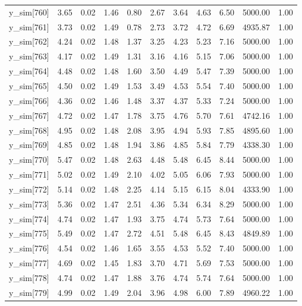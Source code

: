 \begin{table}[ht]
\begin{tabular}{rrrrrrrrrrr}
  y\_sim[760] & 3.65 & 0.02 & 1.46 & 0.80 & 2.67 & 3.64 & 4.63 & 6.50 & 5000.00 & 1.00 \\ 
  y\_sim[761] & 3.73 & 0.02 & 1.49 & 0.78 & 2.73 & 3.72 & 4.72 & 6.69 & 4935.87 & 1.00 \\ 
  y\_sim[762] & 4.24 & 0.02 & 1.48 & 1.37 & 3.25 & 4.23 & 5.23 & 7.16 & 5000.00 & 1.00 \\ 
  y\_sim[763] & 4.17 & 0.02 & 1.49 & 1.31 & 3.16 & 4.16 & 5.15 & 7.06 & 5000.00 & 1.00 \\ 
  y\_sim[764] & 4.48 & 0.02 & 1.48 & 1.60 & 3.50 & 4.49 & 5.47 & 7.39 & 5000.00 & 1.00 \\ 
  y\_sim[765] & 4.50 & 0.02 & 1.49 & 1.53 & 3.49 & 4.53 & 5.54 & 7.40 & 5000.00 & 1.00 \\ 
  y\_sim[766] & 4.36 & 0.02 & 1.46 & 1.48 & 3.37 & 4.37 & 5.33 & 7.24 & 5000.00 & 1.00 \\ 
  y\_sim[767] & 4.72 & 0.02 & 1.47 & 1.78 & 3.75 & 4.76 & 5.70 & 7.61 & 4742.16 & 1.00 \\ 
  y\_sim[768] & 4.95 & 0.02 & 1.48 & 2.08 & 3.95 & 4.94 & 5.93 & 7.85 & 4895.60 & 1.00 \\ 
  y\_sim[769] & 4.85 & 0.02 & 1.48 & 1.94 & 3.86 & 4.85 & 5.84 & 7.79 & 4338.30 & 1.00 \\ 
  y\_sim[770] & 5.47 & 0.02 & 1.48 & 2.63 & 4.48 & 5.48 & 6.45 & 8.44 & 5000.00 & 1.00 \\ 
  y\_sim[771] & 5.02 & 0.02 & 1.49 & 2.10 & 4.02 & 5.05 & 6.06 & 7.93 & 5000.00 & 1.00 \\ 
  y\_sim[772] & 5.14 & 0.02 & 1.48 & 2.25 & 4.14 & 5.15 & 6.15 & 8.04 & 4333.90 & 1.00 \\ 
  y\_sim[773] & 5.36 & 0.02 & 1.47 & 2.51 & 4.36 & 5.34 & 6.34 & 8.29 & 5000.00 & 1.00 \\ 
  y\_sim[774] & 4.74 & 0.02 & 1.47 & 1.93 & 3.75 & 4.74 & 5.73 & 7.64 & 5000.00 & 1.00 \\ 
  y\_sim[775] & 5.49 & 0.02 & 1.47 & 2.72 & 4.51 & 5.48 & 6.45 & 8.43 & 4849.89 & 1.00 \\ 
  y\_sim[776] & 4.54 & 0.02 & 1.46 & 1.65 & 3.55 & 4.53 & 5.52 & 7.40 & 5000.00 & 1.00 \\ 
  y\_sim[777] & 4.69 & 0.02 & 1.45 & 1.83 & 3.70 & 4.71 & 5.69 & 7.53 & 5000.00 & 1.00 \\ 
  y\_sim[778] & 4.74 & 0.02 & 1.47 & 1.88 & 3.76 & 4.74 & 5.74 & 7.64 & 5000.00 & 1.00 \\ 
  y\_sim[779] & 4.99 & 0.02 & 1.49 & 2.04 & 3.96 & 4.98 & 6.00 & 7.89 & 4960.22 & 1.00 \\ 

\end{tabular}
\end{table}
